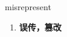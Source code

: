 
\begin{frame}
{\huge misrepresent}
\begin{center}
\begin{enumerate}\Large
  \item \textbf{误传，篡改}
\end{enumerate}
\end{center}
\end{frame}
